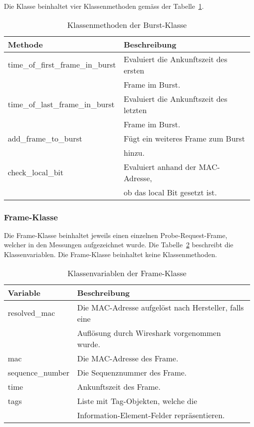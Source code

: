 Die Klasse beinhaltet vier Klassenmethoden gemäss der 
Tabelle~\ref{table:burstmethods}.

\begin{table}[h!]
    \centering
    \begin{tabular}{|l|l|}
        \hline
        \textbf{Methode} & \textbf{Beschreibung} \\
        \hline 
        time\_of\_first\_frame\_in\_burst & Evaluiert die Ankunftszeit des ersten \\
        & Frame im Burst. \\
        \hline
        time\_of\_last\_frame\_in\_burst & Evaluiert die Ankunftszeit des letzten \\
        & Frame im Burst. \\
        \hline
        add\_frame\_to\_burst & Fügt ein weiteres Frame zum Burst\\
        & hinzu. \\
        \hline
        check\_local\_bit & Evaluiert anhand der MAC-Adresse, \\
        & ob das local Bit gesetzt ist. \\
        \hline
    \end{tabular}
    \caption{Klassenmethoden der Burst-Klasse
    \label{table:burstmethods}}  
\end{table}

\clearpage 

\subsubsection*{Frame-Klasse}
Die Frame-Klasse beinhaltet jeweils einen einzelnen Probe-Request-Frame, 
welcher in den Messungen aufgezeichnet wurde.
Die Tabelle~\ref{table:framefields} beschreibt die Klassenvariablen. 
Die Frame-Klasse beinhaltet keine Klassenmethoden. 

\begin{table}[h!]
    \centering
    \begin{tabular}{|l|l|}
        \hline
        \textbf{Variable} & \textbf{Beschreibung} \\
        \hline 
        resolved\_mac & Die MAC-Adresse aufgelöst nach Hersteller, falls eine \\
        & Auflösung durch Wireshark vorgenommen wurde. \\
        \hline
        mac & Die MAC-Adresse des Frame. \\
        \hline
        sequence\_number & Die Sequenznummer des Frame. \\
        \hline
        time & Ankunftszeit des Frame. \\
        \hline
        tags & Liste mit Tag-Objekten, welche die \\ 
        & Information-Element-Felder 
        repräsentieren. \\
        \hline
    \end{tabular}
    \caption{Klassenvariablen der Frame-Klasse
    \label{table:framefields}}  
\end{table}

